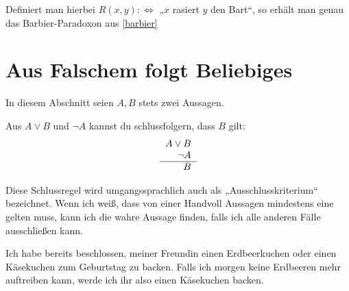  \begin{bem}[*]
  Definiert man hierbei $R(x,y):\Leftrightarrow$ „$x$ rasiert $y$ den Bart“, so erhält man genau das Barbier-Paradoxon aus \cref{barbier}
 \end{bem}
  
  

  
  
  
\section{Aus Falschem folgt Beliebiges}
In diesem Abschnitt seien $A,B$ stets zwei Aussagen.

\begin{axi} \label{modustp}
Aus $A\lor B$ und $\neg A$ kannst du schlussfolgern, dass $B$ gilt:
\[ \begin{tabular}{r}
$A\lor B$ \\
$\neg A$ \\
\hline 
$B$
   \end{tabular} \]
\end{axi}

\begin{bem}
 Diese Schlussregel wird umgangssprachlich auch als „Ausschlusskriterium“ bezeichnet. Wenn ich weiß, dass von einer Handvoll Aussagen mindestens eine gelten muss, kann ich die wahre Aussage finden, falls ich alle anderen Fälle ausschließen kann.
\end{bem}


\begin{bsp}
Ich habe bereits beschlossen, meiner Freundin einen Erdbeerkuchen oder einen Käsekuchen zum Geburtstag zu backen. Falls ich morgen keine Erdbeeren mehr auftreiben kann, werde ich ihr also einen Käsekuchen backen.
\end{bsp}

